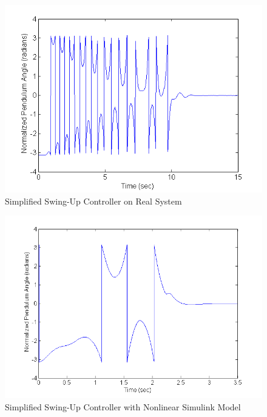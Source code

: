 \documentclass{article}
\theoremstyle{plain}
\theoremstyle{definition}
\theoremstyle{remark}
\begin{document}
\begin{figure}[hbt]
\begin{center}
\includegraphics[width = 13cm]{Q9.png}
\end{center}
\caption{Simplified Swing-Up Controller on Real System}
\label{q9_1}
\end{figure}

\begin{figure}
\begin{center}
\includegraphics[width = 13cm]{Q9sim.png}
\end{center}
\caption{Simplified Swing-Up Controller with Nonlinear Simulink Model}
\label{q9_2}
\end{figure}
\end{document}
